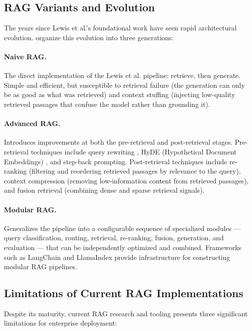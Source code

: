\subsection{RAG Variants and Evolution}

The years since Lewis et al.'s foundational work have seen rapid architectural evolution. \citet{Gao2024} organize this evolution into three generations:

\paragraph{Naive RAG.} The direct implementation of the Lewis et al. pipeline: retrieve, then generate. Simple and efficient, but susceptible to retrieval failure (the generation can only be as good as what was retrieved) and context stuffing (injecting low-quality retrieved passages that confuse the model rather than grounding it).

\paragraph{Advanced RAG.} Introduces improvements at both the pre-retrieval and post-retrieval stages. Pre-retrieval techniques include query rewriting \citep{Ma2023}, HyDE (Hypothetical Document Embeddings) \citep{Gao2022HyDE}, and step-back prompting. Post-retrieval techniques include re-ranking (filtering and reordering retrieved passages by relevance to the query), context compression (removing low-information content from retrieved passages), and fusion retrieval (combining dense and sparse retrieval signals).

\paragraph{Modular RAG.} Generalizes the pipeline into a configurable sequence of specialized modules — query classification, routing, retrieval, re-ranking, fusion, generation, and evaluation — that can be independently optimized and combined. Frameworks such as LangChain \citep{Chase2022} and LlamaIndex \citep{Liu2022} provide infrastructure for constructing modular RAG pipelines.

\subsection{Limitations of Current RAG Implementations}

Despite its maturity, current RAG research and tooling presents three significant limitations for enterprise deployment:


